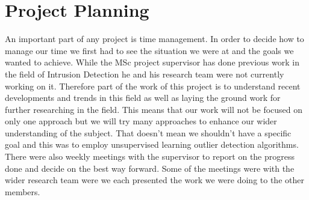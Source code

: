 \documentclass[reqno,openany,12pt]{amsbook}
\begin{document}
\section{Project Planning}

An important part of any project is time management. In order to decide how to manage our time we first had to see the situation we were at and the goals we wanted to achieve. While the MSc project supervisor has done previous work in the field of Intrusion Detection he and his research team were not currently working on it. Therefore part of the work of this project is to understand recent developments and trends in this field as well as laying the ground work for further researching in the field. This means that our work will not be focused on only one approach but we will try many approaches to enhance our wider understanding of the subject. That doesn't mean we shouldn't have a specific goal and this was to employ unsupervised learning outlier detection algorithms. There were also weekly meetings with the supervisor to report on the progress done and decide on the best way forward. Some of the meetings were with the wider research team were we each presented the work we were doing to the other members.
\end{document}
